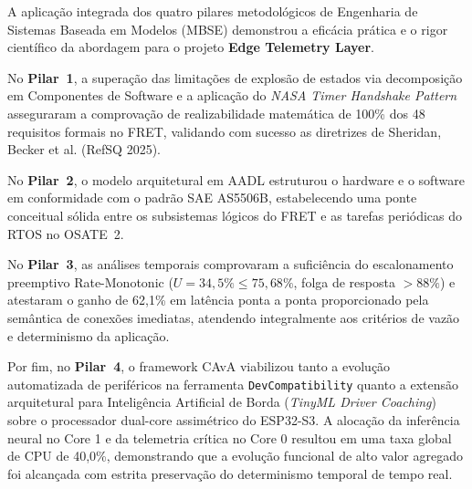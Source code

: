 A aplicação integrada dos quatro pilares metodológicos de Engenharia de Sistemas Baseada em Modelos (MBSE) demonstrou a eficácia prática e o rigor científico da abordagem para o projeto \textbf{Edge Telemetry Layer}.

No \textbf{Pilar~1}, a superação das limitações de explosão de estados via decomposição em Componentes de Software e a aplicação do \textit{NASA Timer Handshake Pattern} asseguraram a comprovação de realizabilidade matemática de 100\% dos 48 requisitos formais no FRET, validando com sucesso as diretrizes de Sheridan, Becker et al. (RefSQ 2025). 

No \textbf{Pilar~2}, o modelo arquitetural em AADL estruturou o hardware e o software em conformidade com o padrão SAE AS5506B, estabelecendo uma ponte conceitual sólida entre os subsistemas lógicos do FRET e as tarefas periódicas do RTOS no OSATE~2.

No \textbf{Pilar~3}, as análises temporais comprovaram a suficiência do escalonamento preemptivo Rate-Monotonic ($U = 34{,}5\% \le 75{,}68\%$, folga de resposta $> 88\%$) e atestaram o ganho de 62{,}1\% em latência ponta a ponta proporcionado pela semântica de conexões imediatas, atendendo integralmente aos critérios de vazão e determinismo da aplicação.

Por fim, no \textbf{Pilar~4}, o framework CAvA viabilizou tanto a evolução automatizada de periféricos na ferramenta \texttt{DevCompatibility} quanto a extensão arquitetural para Inteligência Artificial de Borda (\textit{TinyML Driver Coaching}) sobre o processador dual-core assimétrico do ESP32-S3. A alocação da inferência neural no Core 1 e da telemetria crítica no Core 0 resultou em uma taxa global de CPU de 40{,}0\%, demonstrando que a evolução funcional de alto valor agregado foi alcançada com estrita preservação do determinismo temporal de tempo real.
